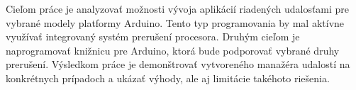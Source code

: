 Cieľom práce je analyzovať možnosti vývoja aplikácií riadených udalosťami pre vybrané modely platformy Arduino. Tento typ programovania by mal aktívne využívať integrovaný systém prerušení procesora. Druhým cieľom je naprogramovať knižnicu pre Arduino, ktorá bude podporovať vybrané druhy prerušení. Výsledkom práce je demonštrovať vytvoreného manažéra udalostí na konkrétnych prípadoch a ukázať výhody, ale aj limitácie takéhoto riešenia.
